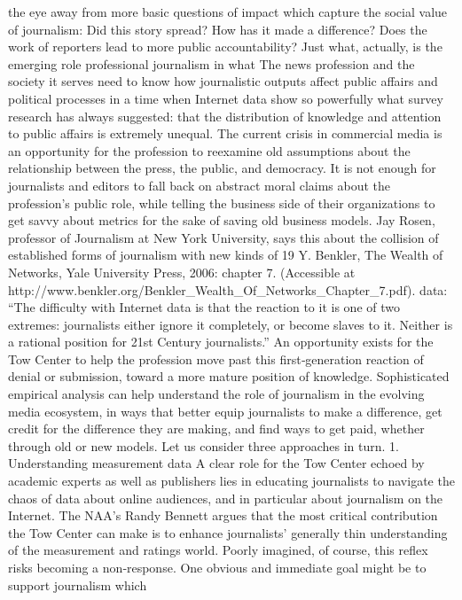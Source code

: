 the eye away from more basic questions of impact which capture the
social value of journalism: Did this story spread? How has it made a
difference? Does the work of reporters lead to more public accountability?
Just what, actually, is the emerging role professional journalism in what
The news profession and the society it serves need to know how
journalistic outputs affect public affairs and political processes in a time
when Internet data show so powerfully what survey research has always
suggested: that the distribution of knowledge and attention to public
affairs is extremely unequal. The current crisis in commercial media is an
opportunity for the profession to reexamine old assumptions about the
relationship between the press, the public, and democracy. It is not
enough for journalists and editors to fall back on abstract moral claims
about the profession’s public role, while telling the business side of their
organizations to get savvy about metrics for the sake of saving old
business models.
Jay Rosen, professor of Journalism at New York University, says this
about the collision of established forms of journalism with new kinds of
19 Y. Benkler, The Wealth of Networks, Yale University Press, 2006:
chapter 7. (Accessible at
http://www.benkler.org/Benkler_Wealth_Of_Networks_Chapter_7.pdf).
data: ``The difficulty with Internet data is that the reaction to it is one of
two extremes: journalists either ignore it completely, or become slaves to
it. Neither is a rational position for 21st Century journalists.''
An opportunity exists for the Tow Center to help the profession move past
this first‐generation reaction of denial or submission, toward a more
mature position of knowledge. Sophisticated empirical analysis can help
understand the role of journalism in the evolving media ecosystem, in
ways that better equip journalists to make a difference, get credit for the
difference they are making, and find ways to get paid, whether through
old or new models. Let us consider three approaches in turn.
1. Understanding measurement data
A clear role for the Tow Center echoed by academic experts as well as
publishers lies in educating journalists to navigate the chaos of data about
online audiences, and in particular about journalism on the Internet. The
NAA’s Randy Bennett argues that the most critical contribution the Tow
Center can make is to enhance journalists’ generally thin understanding of
the measurement and ratings world.
Poorly imagined, of course, this reflex risks becoming a non‐response.
One obvious and immediate goal might be to support journalism which
